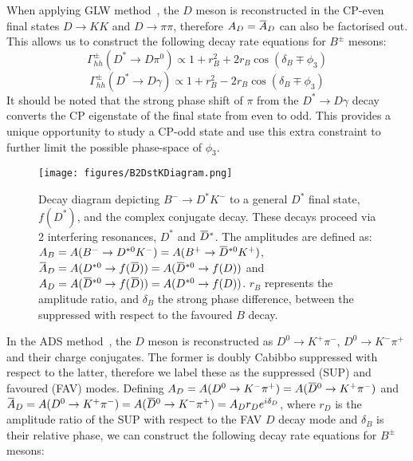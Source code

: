 \documentclass[oneside,12pt]{article}
\newcommand{\overbar}[1]{\mkern 1.5mu\overline{\mkern-1.5mu#1\mkern-1.5mu}\mkern 1.5mu}
\begin{document}
When applying GLW method~\cite{GLWRef}, the $D$ meson is reconstructed in the CP-even final states $D\rightarrow KK$ and $D\rightarrow \pi \pi$, therefore $A_{D}=\overbar{A}_{D}$ can also be factorised out. This allows us to construct the following decay rate equations for $B^{\pm}$ mesons:
  \begin{equation}
		\Gamma_{hh}^{\pm}(D^{*}\rightarrow D\pi^{0})\propto 1 + r_{B}^{2} + 2r_{B}\cos(\delta_{B}\mp \phi_{3})
    \label{eq:DecayRateGLWpi0}
  \end{equation}
  \begin{equation}
		\Gamma_{hh}^{\pm}(D^{*}\rightarrow D\gamma)\propto 1 + r_{B}^{2} - 2r_{B}\cos(\delta_{B}\mp \phi_{3})
    \label{eq:DecayRateGLWgamma}
  \end{equation}
\noindent It should be noted that the strong phase shift of $\pi$ from the $D^{*}\rightarrow D\gamma$ decay converts the CP eigenstate of the final state from even to odd. This provides a unique opportunity to study a CP-odd state and use this extra constraint to further limit the possible phase-space of $\phi_3$. 
\begin{figure}[H]
  \centering
  \texttt{[image: figures/B2DstKDiagram.png]}
  \caption{\small{Decay diagram depicting ${B}^{-}\rightarrow{D}^{*}{K}^{-}$ to a general $D^{*}$ final state, $f(D^{*})$, and the complex conjugate decay. These decays proceed via 2 interfering resonances, $D^{*}$ and $\overbar{D}^{*}$. The amplitudes are defined as: $A_{B}=A(B^{-}\rightarrow D^{*0}K^{-})=A(B^{+}\rightarrow \overbar{D}^{*0}K^{+})$, $\overbar{A}_{D}=A(D^{*0}\rightarrow f(\overbar{D}))=A(\overbar{D}^{*0}\rightarrow f(D))$ and $A_{D}=A(\overbar{D}^{*0}\rightarrow f(\overbar{D}))=A(D^{*0}\rightarrow f(D))$. $r_{B}$ represents the amplitude ratio, and $\delta_{B}$ the strong phase difference, between the suppressed with respect to the favoured $B$ decay.}}
  \label{fig:B2DstKDiagram}
  \vspace{-10pt}
\end{figure}
\noindent In the ADS method~\cite{ADSRef}, the $D$ meson is reconstructed as $D^{0}\rightarrow K^{+}\pi^{-}$, $D^{0}\rightarrow K^{-}\pi^{+}$ and their charge conjugates. The former is doubly Cabibbo suppressed with respect to the latter, therefore we label these as the suppressed (SUP) and favoured (FAV) modes. Defining $A_{D}=A(D^{0}\rightarrow K^{-}\pi^{+})=A(\overbar{D}^{0}\rightarrow K^{+}\pi^{-})$ and $\overbar{A}_{D}= A(D^{0}\rightarrow K^{+}\pi^{-})=A(\overbar{D}^{0}\rightarrow K^{-}\pi^{+})=A_{D}r_{D}e^{i\delta_{D}}$, where $r_{D}$ is the amplitude ratio of the SUP with respect to the FAV $D$ decay mode and $\delta_{B}$ is their relative phase, we can construct the following decay rate equations for $B^{\pm}$ mesons:
\end{document}
